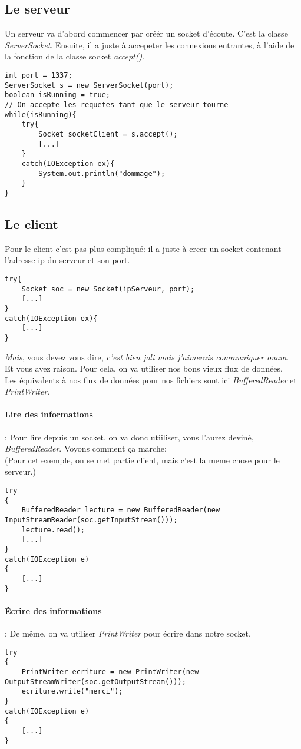 \documentclass{article}
\begin{document}
\subsection{Le serveur}
Un serveur va d'abord commencer par créér un socket d'écoute. C'est la classe \emph{ServerSocket}. Ensuite, il a juste à accepeter les connexions entrantes, à l'aide de la fonction de la classe socket \emph{accept()}.\\
\begin{lstlisting}
int port = 1337;
ServerSocket s = new ServerSocket(port);
boolean isRunning = true;
// On accepte les requetes tant que le serveur tourne
while(isRunning){
	try{
		Socket socketClient = s.accept();
		[...]
	}
	catch(IOException ex){
		System.out.println("dommage");
	}
}
\end{lstlisting}

\subsection{Le client}
Pour le client c'est pas plus compliqué: il a juste à creer un socket contenant l'adresse ip du serveur et son port.
\begin{lstlisting}
try{
	Socket soc = new Socket(ipServeur, port);
	[...]
}
catch(IOException ex){
	[...]
}
\end{lstlisting}

\emph{Mais}, vous devez vous dire, \emph{c'est bien joli mais j'aimerais communiquer ouam}.\\
Et vous avez raison. Pour cela, on va utiliser nos bons vieux flux de données.\\
Les équivalents à nos flux de données pour nos fichiers sont ici \emph{BufferedReader} et \emph{PrintWriter}.\\
\paragraph{Lire des informations} : Pour lire depuis un socket, on va donc utiiliser, vous l'aurez deviné, \emph{BufferedReader}. Voyons comment ça marche:\\
(Pour cet exemple, on se met partie client, mais c'est la meme chose pour le serveur.)
\begin{lstlisting}
try
{
	BufferedReader lecture = new BufferedReader(new InputStreamReader(soc.getInputStream()));
	lecture.read();
	[...]
}
catch(IOException e)
{
	[...]
}
\end{lstlisting}
\paragraph{Écrire des informations} : De même, on va utiliser \emph{PrintWriter} pour écrire dans notre socket.
\begin{lstlisting}
try
{
	PrintWriter ecriture = new PrintWriter(new OutputStreamWriter(soc.getOutputStream()));
	ecriture.write("merci");
}
catch(IOException e)
{
	[...]
}
\end{lstlisting}
\end{document}
